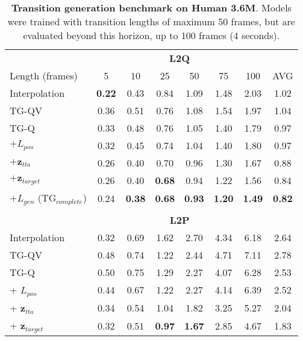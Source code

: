 \documentclass[acmtog]{acmart}
\newcommand{\bz}{\textbf{z}}
\begin{document}
\begin{table}[h]
\caption{\textbf{Transition generation benchmark on Human 3.6M}. Models were trained with transition lengths of maximum 50 frames, but are evaluated beyond this horizon, up to 100 frames (4 seconds).}
    \begin{adjustbox}{width=\columnwidth,center}
    \centering
    \footnotesize
    \renewcommand{\arraystretch}{0.85}
    \begin{tabular}{lcccc|cc|c}
        &\multicolumn{6}{c}{\textbf{L2Q}}\\
        \cmidrule(r){2-8}
        Length (frames) &5&10&25&50&75&100&AVG \\
        \midrule 
        Interpolation                                   & \textbf{0.22} &0.43 &0.84 &1.09 &1.48 &2.03 &1.02\\
        TG-QV                                           & 0.36	&0.51 &0.76	&1.08 &1.54	&1.97 &1.04\\
        \cmidrule(lr){1-8}
        TG-Q                                            & 0.33	&0.48 &0.76	&1.05 &1.40	&1.79 &0.97\\
        $ + L_{\mathit{pos}}$                            & 0.32	&0.45 &0.74	&1.04 &1.40	&1.80 &0.97\\
        $ + \bz_{\mathit{tta}}$                          & 0.26	&0.40 &0.70	&0.96 &1.30 &1.67 &0.88\\ $ + \bz_{\mathit{target}}$                       & 0.26	&0.40 &\textbf{0.68} &0.94 &1.22 &1.56 &0.84\\
        $ + L_{\mathit{gen}}$ ($\mathrm{TG}_{\mathit{complete}}$)                            & 0.24	&\textbf{0.38} &\textbf{0.68} &\textbf{0.93} &\textbf{1.20} &\textbf{1.49} &\textbf{0.82}\\
        \\
        &\multicolumn{6}{c}{\textbf{L2P}}\\
        \cmidrule(r){2-8}
        Interpolation                                   & 0.32  &0.69 &1.62 &2.70 &4.34  &6.18 &2.64\\
        TG-QV                                           & 0.48	&0.74 &1.22	&2.44 &4.71 &7.11 &2.78\\
        \cmidrule(lr){1-8}
        TG-Q                                            & 0.50	&0.75 &1.29	&2.27 &4.07	&6.28 &2.53\\
         + $L_{\mathit{pos}}$                           & 0.44	&0.67 &1.22	&2.27 &4.14	&6.39 &2.52\\
        + $\bz_{\mathit{tta}}$                          & 0.34	&0.54 &1.04	&1.82 &3.25	&5.27 &2.04\\ + $\bz_{\mathit{target}}$                       & 0.32	&0.51 &\textbf{0.97}	&\textbf{1.67} &2.85	&4.67 &1.83\\ 

\end{tabular}
\end{adjustbox}
\end{table}
\end{document}
